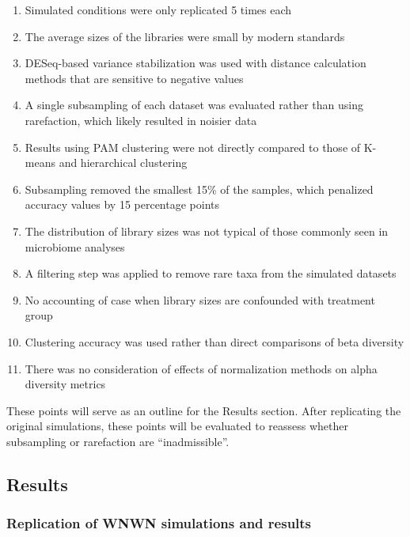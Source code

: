 \documentclass[
]{article}
\providecommand{\tightlist}{%
  \setlength{\itemsep}{0pt}\setlength{\parskip}{0pt}}
\begin{document}
\begin{enumerate}
\def\labelenumi{\arabic{enumi}.}
\tightlist
\item
  Simulated conditions were only replicated 5 times each
\item
  The average sizes of the libraries were small by modern standards
\item
  DESeq-based variance stabilization was used with distance calculation
  methods that are sensitive to negative values
\item
  A single subsampling of each dataset was evaluated rather than using
  rarefaction, which likely resulted in noisier data
\item
  Results using PAM clustering were not directly compared to those of
  K-means and hierarchical clustering
\item
  Subsampling removed the smallest 15\% of the samples, which penalized
  accuracy values by 15 percentage points
\item
  The distribution of library sizes was not typical of those commonly
  seen in microbiome analyses
\item
  A filtering step was applied to remove rare taxa from the simulated
  datasets
\item
  No accounting of case when library sizes are confounded with treatment
  group
\item
  Clustering accuracy was used rather than direct comparisons of beta
  diversity
\item
  There was no consideration of effects of normalization methods on
  alpha diversity metrics
\end{enumerate}

These points will serve as an outline for the Results section. After
replicating the original simulations, these points will be evaluated to
reassess whether subsampling or rarefaction are ``inadmissible''.

\hypertarget{results}{%
\subsection{Results}\label{results}}

\hypertarget{replication-of-wnwn-simulations-and-results}{%
\subsubsection{Replication of WNWN simulations and
results}\label{replication-of-wnwn-simulations-and-results}}
\end{document}

